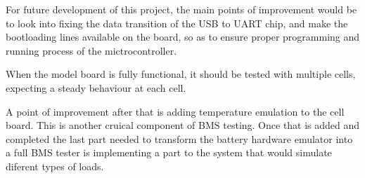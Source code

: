 \IEEEPARstart
{F}{or} future development of this project, the main points of improvement would be to look into fixing the 
data transition of the USB to UART chip, and make the bootloading lines available on the board, so as to ensure
proper programming and running process of the mictrocontroller. 

When the model board is fully functional, it should be tested with multiple cells, expecting a steady behaviour at 
each cell.

A point of improvement after that is adding temperature emulation to the cell board. This is another cruical component 
of BMS testing. Once that is added and completed the last part needed to transform the battery hardware emulator into a 
full BMS tester is implementing a part to the system that would simulate diferent types of loads. 